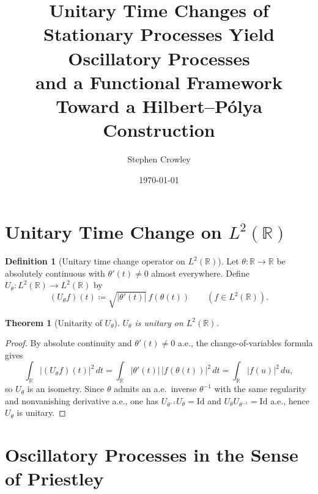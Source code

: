 \documentclass[12pt]{article}
\title{Unitary Time Changes of Stationary Processes Yield Oscillatory Processes\\
and a Functional Framework Toward a Hilbert--P\'olya Construction}
\author{Stephen Crowley}
\date{\today}
\newtheorem{theorem}{Theorem}
\theoremstyle{definition}
\newtheorem{definition}{Definition}
\theoremstyle{remark}
\begin{document}
\maketitle

\section{Unitary Time Change on $L^2(\mathbb{R})$}

\begin{definition}[Unitary time change operator on $L^2(\mathbb{R})$]
Let $\theta:\mathbb{R}\to\mathbb{R}$ be absolutely continuous with $\theta'(t)\neq 0$ almost everywhere.
Define $U_\theta:L^2(\mathbb{R})\to L^2(\mathbb{R})$ by
\begin{equation}
  (U_\theta f)(t)\coloneqq \sqrt{|\theta'(t)|}\, f(\theta(t))\qquad (f\in L^2(\mathbb{R})).
\end{equation}
\end{definition}

\begin{theorem}[Unitarity of $U_\theta$]
$U_\theta$ is unitary on $L^2(\mathbb{R})$.
\end{theorem}

\begin{proof}
By absolute continuity and $\theta'(t)\neq 0$ a.e., the change-of-variables formula gives
\[
\int_{\mathbb{R}} |(U_\theta f)(t)|^2\,dt
= \int_{\mathbb{R}} |\theta'(t)|\,|f(\theta(t))|^2\,dt
= \int_{\mathbb{R}} |f(u)|^2\,du,
\]
so $U_\theta$ is an isometry. Since $\theta$ admits an a.e.\ inverse $\theta^{-1}$ with the same regularity and nonvanishing derivative a.e., one has $U_{\theta^{-1}}U_\theta=\mathrm{Id}$ and $U_\theta U_{\theta^{-1}}=\mathrm{Id}$ a.e., hence $U_\theta$ is unitary.
\end{proof}

\section{Oscillatory Processes in the Sense of Priestley}
\end{document}
